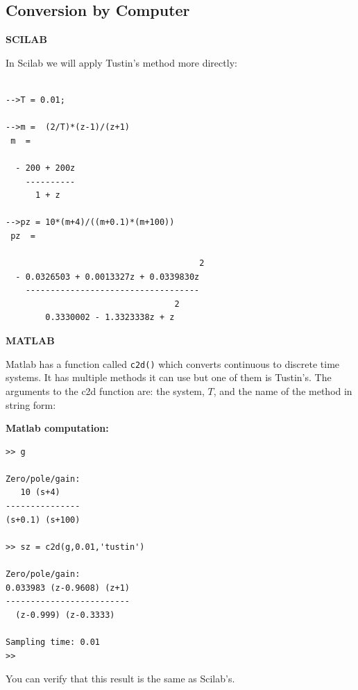 
\subsection{Conversion  by  Computer}


{\bf SCILAB }

In  Scilab we will apply  Tustin's method more  directly:


\begin{verbatim}

-->T = 0.01;

-->m =  (2/T)*(z-1)/(z+1)
 m  =

  - 200 + 200z
    ----------
      1 + z

-->pz = 10*(m+4)/((m+0.1)*(m+100))
 pz  =

                                       2
  - 0.0326503 + 0.0013327z + 0.0339830z
    -----------------------------------
                                  2
        0.3330002 - 1.3323338z + z

\end{verbatim}


 {\bf MATLAB}	%

 Matlab has a function called {\tt c2d()} which converts continuous to discrete time systems.  It has multiple methods it can use but one of them is Tustin's. The arguments to the c2d function are:  the system, $T$, and the name of the method in string form:	%

{\bf Matlab computation: }
\begin{verbatim}
>> g

Zero/pole/gain:
   10 (s+4)
---------------
(s+0.1) (s+100)

>> sz = c2d(g,0.01,'tustin')

Zero/pole/gain:
0.033983 (z-0.9608) (z+1)
-------------------------
  (z-0.999) (z-0.3333)

Sampling time: 0.01
>>
\end{verbatim}



You can  verify  that  this result is the same as Scilab's.

